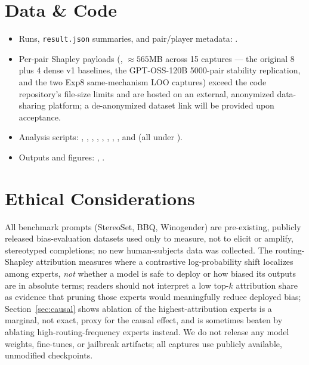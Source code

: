\documentclass[sigconf]{acmart}
\begin{document}
\section*{Data \& Code}
\begin{itemize}\setlength\itemsep{0pt}
\item Runs, \texttt{result.json} summaries, and pair/player metadata:
  .
\item Per-pair Shapley payloads (, $\approx 565$MB
  across 15 captures --- the original 8 plus 4 dense v1 baselines, the
  GPT-OSS-120B 5000-pair stability replication, and the two Exp8
  same-mechanism LOO captures) exceed the code repository's file-size
  limits and are hosted on an external, anonymized data-sharing platform; a
  de-anonymized dataset link will be provided upon acceptance.
\item Analysis scripts: ,
  , ,
  , ,
  , ,
  , and 
  (all under ).
\item Outputs and figures: ,
  .
\end{itemize}

\section*{Ethical Considerations}
All benchmark prompts (StereoSet, BBQ, Winogender) are pre-existing,
publicly released bias-evaluation datasets used only to measure, not to
elicit or amplify, stereotyped completions; no new human-subjects data was
collected. The routing-Shapley attribution measures where a
contrastive log-probability shift localizes among experts, \emph{not}
whether a model is safe to deploy or how biased its outputs are in
absolute terms; readers should not interpret a low top-$k$ attribution
share as evidence that pruning those experts would meaningfully reduce
deployed bias; Section~\ref{sec:causal} shows ablation of the
highest-attribution experts is a marginal, not exact, proxy for the
causal effect, and is sometimes beaten by ablating high-routing-frequency
experts instead. We do not release any model weights, fine-tunes, or
jailbreak artifacts; all captures use publicly available, unmodified
checkpoints.
\end{document}
